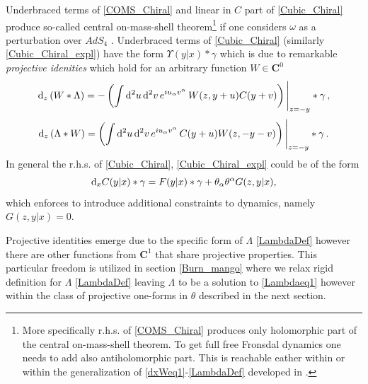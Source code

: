 \documentclass[12pt]{article}
\newcommand{\dr}{{{\rm d}}}
\begin{document}
Underbraced terms of \eqref{COMS_Chiral} and linear in $C$ part of \eqref{Cubic_Chiral} produce so-called central on-mass-shell theorem\footnote{More specifically r.h.s. of \eqref{COMS_Chiral} produces only holomorphic part of the central on-mass-shell theorem. To get full free Fronsdal dynamics one needs to add also antiholomorphic part. This is reachable eather within \cite{Vasiliev:1990en} or within the generalization of \eqref{dxWeq1}-\eqref{LambdaDef} developed in \cite{Didenko:2026nag}.} \cite{Vasiliev:1999ba} if one considers $\omega$ as  a perturbation over $AdS_4$ . Underbraced terms of \eqref{Cubic_Chiral} (similarly \eqref{Cubic_Chiral_expl}) have the form $\Upsilon(y|x)\ast \gamma$ which is due to remarkable {\it projective idenities} which hold for an arbitrary function $W\in \mathbf{C}^0$
\begin{equation}\label{Proj1}
\dr_z\left(W\ast \Lambda\right)=-\left(\int \dr^2 u\, \dr^2 v \,e^{iu_\alpha v^\alpha}\, W(z,y+u)C(y+v)\right)\Bigg|_{z=-y}\ast \gamma\,,
\end{equation}
\begin{equation}\label{Proj2}
\dr_z\left(\Lambda\ast W\right)=\left(\int \dr^2 u \, \dr^2 v\, e^{iu_\alpha v^\alpha}\, C(y+u) W(z,-y-v)\right)\Bigg|_{z=-y}\ast \gamma \,. 
\end{equation}
In general the r.h.s. of \eqref{Cubic_Chiral}, \eqref{Cubic_Chiral_expl} could be of the form
\begin{equation}\label{unwanted}
\dr_x C(y|x)\ast \gamma=F(y|x)\ast \gamma+\theta_\alpha\theta^\alpha G(z,y|x),
\end{equation}
which enforces to introduce additional constraints to dynamics, namely $G(z,y|x)=0$.

Projective identities emerge due to the specific form of $\Lambda$ \eqref{LambdaDef} however there are other functions from $\mathbf{C}^1$ that share projective properties. This particular freedom is utilized in section \ref{Burn_mango} where we relax rigid definition for $\Lambda$ \eqref{LambdaDef} leaving $\Lambda$ to be a solution to \eqref{Lambdaeq1} however within the class of projective one-forms in $\theta$ described in the next section. 
\end{document}
